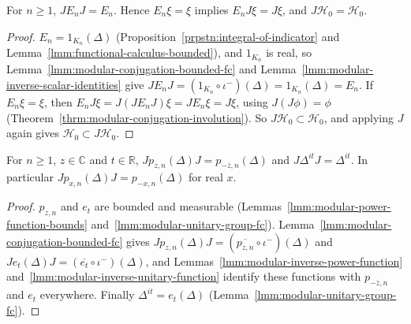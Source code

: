 \begin{lemma}
    \label{lmm:modular-conjugation-spectral-projections}
    \leanok
    For $n \ge 1$, $JE_nJ = E_n$. Hence $E_n\xi = \xi$ implies $E_nJ\xi = J\xi$, and $J\mathcal{H}_0 = \mathcal{H}_0$.
\end{lemma}
\begin{proof}
    \leanok
    $E_n = 1_{K_n}(\Delta)$ (Proposition~\ref{prpstn:integral-of-indicator} and Lemma~\ref{lmm:functional-calculus-bounded}), and $1_{K_n}$ is real, so Lemma~\ref{lmm:modular-conjugation-bounded-fc} and Lemma~\ref{lmm:modular-inverse-scalar-identities} give $JE_nJ = (1_{K_n} \circ \iota^-)(\Delta) = 1_{K_n}(\Delta) = E_n$. If $E_n\xi = \xi$, then $E_nJ\xi = J(JE_nJ)\xi = JE_n\xi = J\xi$, using $J(J\phi) = \phi$ (Theorem~\ref{thrm:modular-conjugation-involution}). So $J\mathcal{H}_0 \subset \mathcal{H}_0$, and applying $J$ again gives $\mathcal{H}_0 \subset J\mathcal{H}_0$.
\end{proof}

\begin{lemma}
    \label{lmm:modular-conjugation-powers}
    \leanok
    For $n \ge 1$, $z \in \mathbb{C}$ and $t \in \mathbb{R}$, $Jp_{z,n}(\Delta)J = p_{-\overline{z},n}(\Delta)$ and $J\Delta^{it}J = \Delta^{it}$. In particular $Jp_{x,n}(\Delta)J = p_{-x,n}(\Delta)$ for real $x$.
\end{lemma}
\begin{proof}
    \leanok
    $p_{z,n}$ and $e_t$ are bounded and measurable (Lemmas~\ref{lmm:modular-power-function-bounds} and~\ref{lmm:modular-unitary-group-fc}). Lemma~\ref{lmm:modular-conjugation-bounded-fc} gives $Jp_{z,n}(\Delta)J = (\overline{p_{z,n}} \circ \iota^-)(\Delta)$ and $Je_t(\Delta)J = (\overline{e_t} \circ \iota^-)(\Delta)$, and Lemmas~\ref{lmm:modular-inverse-power-function} and~\ref{lmm:modular-inverse-unitary-function} identify these functions with $p_{-\overline{z},n}$ and $e_t$ everywhere. Finally $\Delta^{it} = e_t(\Delta)$ (Lemma~\ref{lmm:modular-unitary-group-fc}).
\end{proof}

